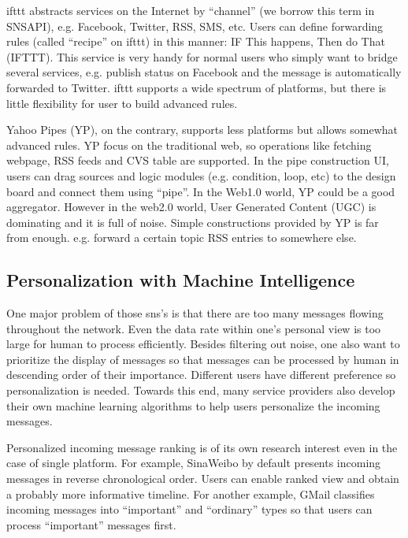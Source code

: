 \documentclass{sig-alternate}
\begin{document}
ifttt abstracts services on the Internet by ``channel'' 
(we borrow this term in SNSAPI), 
e.g. Facebook, Twitter, RSS, SMS, etc. 
Users can define forwarding rules (called ``recipe'' on ifttt)
in this manner:
IF This happens, Then do That (IFTTT). 
This service is very handy for normal users who simply want to bridge several services, 
e.g. publish status on Facebook and the message is automatically forwarded to Twitter. 
ifttt supports a wide spectrum of platforms, 
but there is little flexibility for user to build advanced rules. 

Yahoo Pipes (YP), on the contrary, supports less platforms but allows somewhat advanced rules. 
YP focus on the traditional web, so operations like 
fetching webpage, RSS feeds and CVS table are supported. 
In the pipe construction UI, users can drag sources 
and logic modules (e.g. condition, loop, etc) to the design board
and connect them using ``pipe''.
In the Web1.0 world, YP could be a good aggregator. 
However in the web2.0 world, 
User Generated Content (UGC) is dominating 
and it is full of noise. 
Simple constructions provided by YP is far from enough. 
e.g. forward a certain topic RSS entries to somewhere else. 

\subsection{Personalization with Machine Intelligence}
\label{sec:Personalization with Machine Intelligence}

One major problem of those \gls{sns}'s is that there are too 
many messages flowing throughout the network. 
Even the data rate within one's personal view is too large for human to process efficiently. 
Besides filtering out noise, one also want to prioritize the display of messages 
so that messages can be processed by human in descending order of their importance. 
Different users have different preference so personalization is needed. 
Towards this end, many service providers also develop their own 
machine learning algorithms to help users personalize the incoming messages. 

Personalized incoming message ranking is of its own research interest 
even in the case of single platform. 
For example, SinaWeibo by default presents incoming messages 
in reverse chronological order. 
Users can enable ranked view and obtain a probably more informative timeline. 
For another example, GMail classifies incoming messages 
into ``important'' and ``ordinary'' types 
so that users can process ``important'' messages first. 
\end{document}
